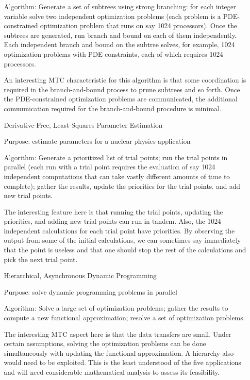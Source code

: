 \documentclass[10pt,letterpaper]{article}
\begin{document}
\begin{description}
  Algorithm:
    Generate a set of subtrees using strong branching:
      for each integer variable solve two independent optimization problems 
        (each problem is a PDE-constrained optimization problem that runs on
          say 1024 processors).
    Once the subtrees are generated, run branch and bound on each
       of them independently.
    Each independent branch and bound on the subtree solves, for example, 1024
       optimization problems with PDE constraints, each of which requires
       1024 processors.

An interesting MTC characteristic for this algorithm is that some coordination is required in
the branch-and-bound process to prune subtrees and so forth.  Once the PDE-constrained
optimization problems are communicated, the additional
communication required for the branch-and-bound procedure is minimal.

\item Derivative-Free, Least-Squares Parameter Estimation

  Purpose: estimate parameters for a nuclear physics application
  
  Algorithm:
    Generate a prioritized list of trial points;
    run the trial points in parallel
      (each run with a trial point requires the evaluation of say 1024
        independent computations that can take vastly different
        amounts of time to complete);
   gather the results, update the priorities for the trial points, and add
      new trial points.

The interesting feature here is that running the trial points, 
updating the priorities, and adding new trial points can run in tandem.
Also, the 1024 independent calculations for each trial point have
priorities.  By observing the output from some of the initial calculations,
we can sometimes say immediately that the point is useless and that 
one should stop the rest of the calculations and pick the next trial point.

\item Hierarchical, Asynchronous Dynamic Programming

   Purpose: solve dynamic programming problems in parallel
   
   Algorithm:
     Solve a large set of optimization problems;
     gather the results to compute a new functional approximation;
     resolve a set of optimization problems.

The interesting MTC aspect here is that the data transfers are small.  Under
certain assumptions, solving the optimization problems can be
done simultaneously with updating the functional approximation.
A hierarchy also would need to be exploited.  This
is the least understood of the five applications and will need considerable mathematical analysis to assess its feasibility.

\end{description}
\end{document}
